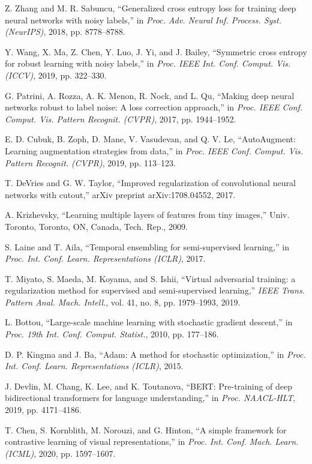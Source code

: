\documentclass{ieeeaccess}
\begin{document}
\begin{thebibliography}{00}
 Z. Zhang and M. R. Sabuncu, ``Generalized cross entropy loss for training deep neural networks with noisy labels,'' in \emph{Proc. Adv. Neural Inf. Process. Syst. (NeurIPS)}, 2018, pp. 8778--8788.

 Y. Wang, X. Ma, Z. Chen, Y. Luo, J. Yi, and J. Bailey, ``Symmetric cross entropy for robust learning with noisy labels,'' in \emph{Proc. IEEE Int. Conf. Comput. Vis. (ICCV)}, 2019, pp. 322--330.

 G. Patrini, A. Rozza, A. K. Menon, R. Nock, and L. Qu, ``Making deep neural networks robust to label noise: A loss correction approach,'' in \emph{Proc. IEEE Conf. Comput. Vis. Pattern Recognit. (CVPR)}, 2017, pp. 1944--1952.

 E. D. Cubuk, B. Zoph, D. Mane, V. Vasudevan, and Q. V. Le, ``AutoAugment: Learning augmentation strategies from data,'' in \emph{Proc. IEEE Conf. Comput. Vis. Pattern Recognit. (CVPR)}, 2019, pp. 113--123.

 T. DeVries and G. W. Taylor, ``Improved regularization of convolutional neural networks with cutout,'' arXiv preprint arXiv:1708.04552, 2017.

 A. Krizhevsky, ``Learning multiple layers of features from tiny images,'' Univ. Toronto, Toronto, ON, Canada, Tech. Rep., 2009.

 S. Laine and T. Aila, ``Temporal ensembling for semi-supervised learning,'' in \emph{Proc. Int. Conf. Learn. Representations (ICLR)}, 2017.

 T. Miyato, S. Maeda, M. Koyama, and S. Ishii, ``Virtual adversarial training: a regularization method for supervised and semi-supervised learning,'' \emph{IEEE Trans. Pattern Anal. Mach. Intell.}, vol. 41, no. 8, pp. 1979--1993, 2019.

 L. Bottou, ``Large-scale machine learning with stochastic gradient descent,'' in \emph{Proc. 19th Int. Conf. Comput. Statist.}, 2010, pp. 177--186.

 D. P. Kingma and J. Ba, ``Adam: A method for stochastic optimization,'' in \emph{Proc. Int. Conf. Learn. Representations (ICLR)}, 2015.

 J. Devlin, M. Chang, K. Lee, and K. Toutanova, ``BERT: Pre-training of deep bidirectional transformers for language understanding,'' in \emph{Proc. NAACL-HLT}, 2019, pp. 4171--4186.

 T. Chen, S. Kornblith, M. Norouzi, and G. Hinton, ``A simple framework for contrastive learning of visual representations,'' in \emph{Proc. Int. Conf. Mach. Learn. (ICML)}, 2020, pp. 1597--1607.


\end{thebibliography}
\end{document}
